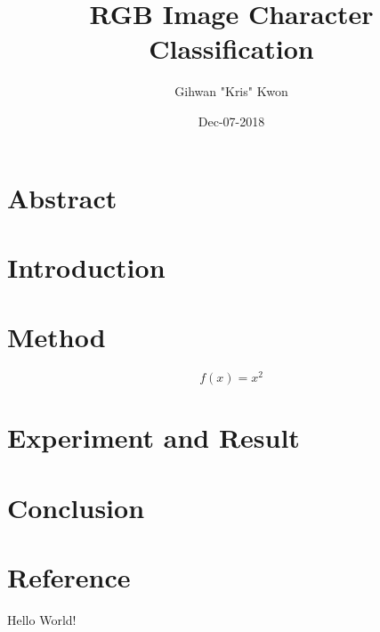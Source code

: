 \documentclass{article}
\title{RGB Image Character Classification}
\date{Dec-07-2018}
\author{Gihwan "Kris" Kwon}
\begin{document}
    \maketitle

    \section{Abstract}


    \section{Introduction}
        \subsection{}
        \paragraph{}
        \subparagraph{}

    \section{Method}
        \begin{equation}
        f(x) = x^2
        \end{equation}
    \section{Experiment and Result}

    \section{Conclusion}

    \section{Reference}


    Hello World!
\end{document}
